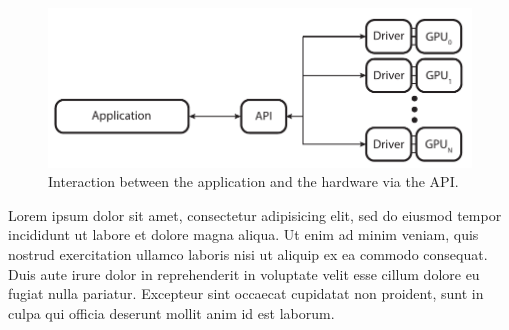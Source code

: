 


  \begin{figure}
    \centering
    \includegraphics[width=\textwidth]{Main/Images/Application_API_Driver_Overview}
    \caption{Interaction between the application and the hardware via the API.}
    \label{fig:AppApiDriverOverview}
  \end{figure}

  Lorem ipsum dolor sit amet, consectetur adipisicing elit, sed do eiusmod
  tempor incididunt ut labore et dolore magna aliqua. Ut enim ad minim veniam,
  quis nostrud exercitation ullamco laboris nisi ut aliquip ex ea commodo
  consequat. Duis aute irure dolor in reprehenderit in voluptate velit esse
  cillum dolore eu fugiat nulla pariatur. Excepteur sint occaecat cupidatat non
  proident, sunt in culpa qui officia deserunt mollit anim id est laborum.

